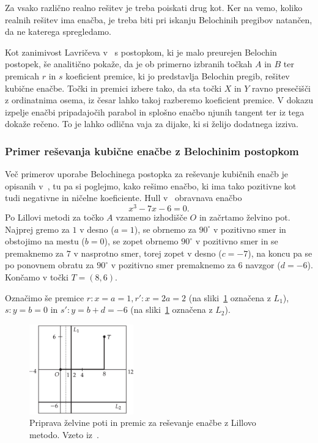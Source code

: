 \begin{opomba}
    Za vsako različno realno rešitev je treba poiskati drug kot. Ker na vemo, koliko realnih rešitev ima enačba, je treba biti pri iskanju Belochinih pregibov natančen, da ne katerega spregledamo.
\end{opomba}

Kot zanimivost Lavričeva v~\cite[str.\ 10--13]{lavric2013} s postopkom, ki je malo preurejen Belochin postopek, še analitično pokaže, da je ob primerno izbranih točkah $A$ in $B$ ter premicah $r$ in $s$ koeficient premice, ki jo predstavlja Belochin pregib, rešitev kubične enačbe. Točki in premici izbere tako, da sta točki $X$ in $Y$ ravno presečišči z ordinatnima osema, iz česar lahko takoj razberemo koeficient premice. V dokazu izpelje enačbi pripadajočih parabol in splošno enačbo njunih tangent ter iz tega dokaže rečeno. To je lahko odlična vaja za dijake, ki si želijo dodatnega izziva.

\subsubsection*{Primer reševanja kubične enačbe z Belochinim postopkom}

Več primerov uporabe Belochinega postopka za reševanje kubičnih enačb je opisanih v~\cite[38--44]{zore2022}, tu pa si poglejmo, kako rešimo enačbo, ki ima tako pozitivne kot tudi negativne in ničelne koeficiente. Hull v~\cite[str.\ 90--92]{hull2013} obravnava enačbo
$$ x^3 - 7x - 6 = 0.$$
Po Lillovi metodi za točko $A$ vzamemo izhodišče $O$ in začrtamo želvino pot. Najprej gremo za $1$ v desno ($a=1$), se obrnemo za $90^\circ$ v pozitivno smer in obstojimo na mestu ($b=0$), se zopet obrnemo  $90^\circ$ v pozitivno smer in se premaknemo za $7$ v nasprotno smer, torej zopet v desno ($c=-7$), na koncu pa se po ponovnem obratu za $90^\circ$ v pozitivno smer premaknemo za 6 navzgor ($d=-6$). Končamo v točki $T = (8, 6)$.

Označimo še premice $r: x = a = 1, r': x = 2a = 2$ (na sliki~\ref{fig:lill_primer1} označena z $L_1$), $s: y = b = 0$ in $s': y = b + d = -6$ (na sliki~\ref{fig:lill_primer1} označena z $L_2$).

\begin{figure}[h]
    \centering
    \includegraphics[width=0.4\textwidth]{images/kubična enačba/lill_primer_setup.png}
    \caption[Primer reševanja z Lillovo metodo (priprava)]{Priprava želvine poti in premic za reševanje enačbe z Lillovo metodo. Vzeto iz~\cite[str. 87]{hull2013}.}
    \label{fig:lill_primer1}
\end{figure}

